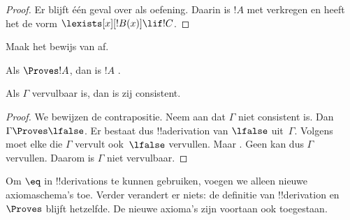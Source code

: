 \documentclass[openany]{memoir}
\begin{document}
\begin{proof}
{Er blijft één geval over als oefening. Daarin is $!A$ met \QR{}
verkregen en heeft het de vorm $\lexists[x][!B(x)] \lif !C$.}{}
\end{proof}

\begin{prob}
  Maak het bewijs van  af.
\end{prob}
\tagendprob

\begin{cor}
Als $\Proves !A$, dan is $!A$ .
\end{cor}

\begin{cor}
Als $\Gamma$ vervulbaar is, dan is zij consistent.
\end{cor}

\begin{proof}
We bewijzen de contrapositie. Neem aan dat $\Gamma$ niet consistent
is. Dan $\Gamma \Proves \lfalse$. Er bestaat dus !!a{derivation} van
$\lfalse$ uit~$\Gamma$. Volgens  moet elke
die $\Gamma$ vervult ook~$\lfalse$ vervullen. Maar
. Geen
 kan dus $\Gamma$ vervullen.
Daarom is $\Gamma$ niet vervulbaar.
\end{proof}
\endgroup

\begingroup
\def\olfilename{OLP-0125}
\def\olfilepath{content/first-order-logic/axiomatic-deduction/}
\hypertarget{unit-OLP-0125}{}





Om $\eq$ in !!{derivation}s te kunnen gebruiken, voegen we alleen
nieuwe axiomaschema's toe. Verder verandert er niets: de definitie van
!!{derivation} en $\Proves$ blijft hetzelfde. De nieuwe axioma's zijn
voortaan ook toegestaan.
\end{document}
